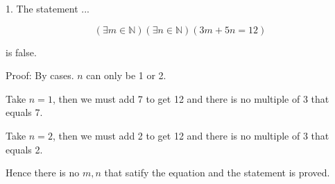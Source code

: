\documentclass[12pt]{article}
\begin{document}
1. The statement ...

$$(\exists m \in \mathbb{N})(\exists n \in \mathbb{N})(3m + 5n = 12)$$

is false.\newline

Proof: By cases. $n$ can only be 1 or 2.\newline

Take $n=1$, then we must add 7 to get 12 and there is no multiple of 3 that equals 7.\newline

Take $n=2$, then we must add 2 to get 12 and there is no multiple of 3 that equals 2.\newline

Hence there is no $m,n$ that satify the equation and the statement is proved. 
\end{document}
